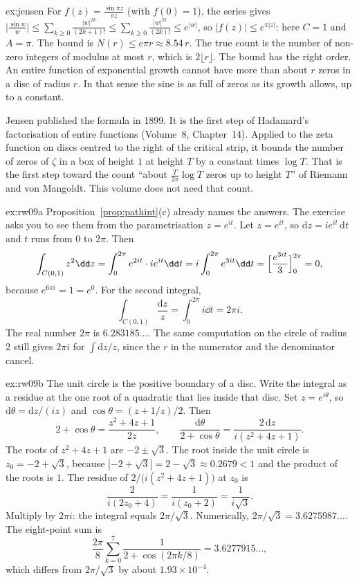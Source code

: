 \begin{solution}{ex:jensen}
For $f(z)=\frac{\sin\pi z}{\pi z}$ (with $f(0)=1$), the series gives $\bigl|\frac{\sin w}w\bigr|\le\sum_{k\ge0}\frac{|w|^{2k}}{(2k+1)!}\le\sum_{k\ge0}\frac{|w|^{2k}}{(2k)!}\le e^{|w|}$, so $|f(z)|\le e^{\pi|z|}$: here $C=1$ and $A=\pi$. The bound is $N(r)\le e\pi r\approx8.54\,r$. The true count is the number of non-zero integers of modulus at most $r$, which is $2\lfloor r\rfloor$. The bound has the right order. An entire function of exponential growth cannot have more than about $r$ zeros in a disc of radius $r$. In that sense the sine is as full of zeros as its growth allows, up to a constant.

\leads Jensen published the formula in 1899. It is the first step of Hadamard's factorisation of entire functions (Volume~8, Chapter~14). Applied to the zeta function on discs centred to the right of the critical strip, it bounds the number of zeros of $\zeta$ in a box of height $1$ at height $T$ by a constant times $\log T$. That is the first step toward the count ``about $\frac T{2\pi}\log T$ zeros up to height $T$'' of Riemann and von Mangoldt. This volume does not need that count.
\end{solution}

\begin{solution}{ex:rw09a}
\idea Proposition~\ref{prop:pathint}(c) already names the answers. The exercise asks you to see them from the parametrisation $z=e^{it}$.
\writeup Let $z=e^{it}$, so $\mathrm dz=ie^{it}\,\mathrm dt$ and $t$ runs from $0$ to $2\pi$. Then
\[
\int_{C(0,1)}z^2\dd z=\int_0^{2\pi}e^{2it}\cdot ie^{it}\dd t=i\int_0^{2\pi}e^{3it}\dd t=\Bigl[\frac{e^{3it}}3\Bigr]_0^{2\pi}=0,
\]
because $e^{6\pi i}=1=e^{0}$. For the second integral,
\[
\int_{C(0,1)}\frac{\mathrm dz}z=\int_0^{2\pi}i\dd t=2\pi i.
\]
The real number $2\pi$ is $6.283185\ldots$. The same computation on the circle of radius $2$ still gives $2\pi i$ for $\int\mathrm dz/z$, since the $r$ in the numerator and the denominator cancel.
\end{solution}

\begin{solution}{ex:rw09b}
\idea The unit circle is the positive boundary of a disc. Write the integral as a residue at the one root of a quadratic that lies inside that disc.
\writeup Set $z=e^{i\theta}$, so $\mathrm d\theta=\mathrm dz/(iz)$ and $\cos\theta=(z+1/z)/2$. Then
\[
2+\cos\theta=\frac{z^2+4z+1}{2z},\qquad \frac{\mathrm d\theta}{2+\cos\theta}=\frac{2\,\mathrm dz}{i(z^2+4z+1)}.
\]
The roots of $z^2+4z+1$ are $-2\pm\sqrt3$. The root inside the unit circle is $z_0=-2+\sqrt3$, because $|-2+\sqrt3|=2-\sqrt3\approx0.2679<1$ and the product of the roots is $1$. The residue of $2\big/\bigl(i(z^2+4z+1)\bigr)$ at $z_0$ is
\[
\frac{2}{i(2z_0+4)}=\frac{1}{i(z_0+2)}=\frac{1}{i\sqrt3}.
\]
Multiply by $2\pi i$: the integral equals $2\pi/\sqrt3$. Numerically, $2\pi/\sqrt3=3.6275987\ldots$. The eight-point sum is
\[
\frac{2\pi}8\sum_{k=0}^{7}\frac1{2+\cos(2\pi k/8)}=3.6277915\ldots,
\]
which differs from $2\pi/\sqrt3$ by about $1.93\times10^{-4}$.
\end{solution}

